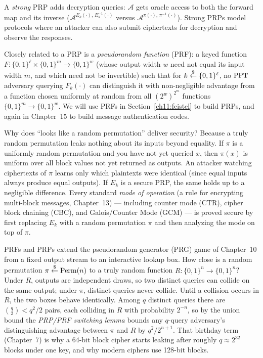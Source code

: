 A \emph{strong} PRP adds decryption queries: $\mathcal{A}$ gets oracle access to both the forward map and its inverse ($\mathcal{A}^{E_k(\cdot),\, E_k^{-1}(\cdot)}$ versus $\mathcal{A}^{\pi(\cdot),\, \pi^{-1}(\cdot)}$). Strong PRPs model protocols where an attacker can also submit ciphertexts for decryption and observe the responses.

Closely related to a PRP is a \emph{pseudorandom function} (PRF): a keyed function $F : \{0,1\}^{\ell} \times \{0,1\}^{m} \to \{0,1\}^{w}$ (whose output width $w$ need not equal its input width $m$, and which need not be invertible) such that for $k \stackrel{\$}{\gets} \{0,1\}^{\ell}$, no $\mathrm{PPT}$ adversary querying $F_k(\cdot)$ can distinguish it with non-negligible advantage from a function chosen uniformly at random from all $(2^w)^{2^m}$ functions $\{0,1\}^m \to \{0,1\}^w$. We will use PRFs in Section~\ref{ch11:feistel} to build PRPs, and again in Chapter~15 to build message authentication codes.

\begin{whybox}
Why does ``looks like a random permutation'' deliver security? Because a truly random permutation leaks nothing about its inputs beyond equality. If $\pi$ is a uniformly random permutation and you have not yet queried $x$, then $\pi(x)$ is uniform over all block values not yet returned as outputs. An attacker watching ciphertexts of $\pi$ learns only which plaintexts were identical (since equal inputs always produce equal outputs). If $E_k$ is a secure PRP, the same holds up to a negligible difference. Every standard \emph{mode of operation} (a rule for encrypting multi-block messages, Chapter~13) --- including counter mode (CTR), cipher block chaining (CBC), and Galois/Counter Mode (GCM) --- is proved secure by first replacing $E_k$ with a random permutation $\pi$ and then analyzing the mode on top of $\pi$.
\end{whybox}

\begin{connectionbox}
PRFs and PRPs extend the pseudorandom generator (PRG) game of Chapter~10 from a fixed output stream to an interactive lookup box. How close is a random permutation $\pi \stackrel{\$}{\gets} \mathrm{Perm}(n)$ to a truly random function $R : \{0,1\}^n \to \{0,1\}^n$? Under $R$, outputs are independent draws, so two distinct queries can collide on the same output; under $\pi$, distinct queries never collide. Until a collision occurs in $R$, the two boxes behave identically. Among $q$ distinct queries there are $\binom{q}{2} < q^2/2$ pairs, each colliding in $R$ with probability $2^{-n}$, so by the union bound the \emph{PRP/PRF switching lemma} bounds any $q$-query adversary's distinguishing advantage between $\pi$ and $R$ by $q^2 / 2^{n+1}$. That birthday term (Chapter~7) is why a 64-bit block cipher starts leaking after roughly $q \approx 2^{32}$ blocks under one key, and why modern ciphers use 128-bit blocks.
\end{connectionbox}


